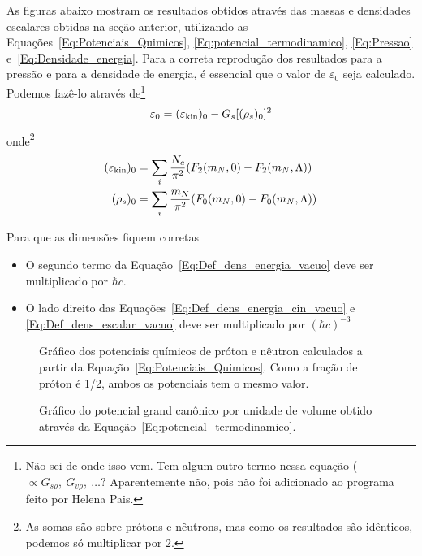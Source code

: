 As figuras abaixo mostram os resultados obtidos através das massas e densidades escalares obtidas na seção anterior, utilizando as Equações~\eqref{Eq:Potenciais_Quimicos}, \eqref{Eq:potencial_termodinamico}, \eqref{Eq:Pressao} e~\eqref{Eq:Densidade_energia}. Para a correta reprodução dos resultados para a pressão e para a densidade de energia, é essencial que o valor de $\varepsilon_0$ seja calculado. Podemos fazê-lo através de\footnote{Não sei de onde isso vem. Tem algum outro termo nessa equação ($\propto G_{s\rho},~G_{v\rho},~\dots$? Aparentemente não, pois não foi adicionado ao programa feito por Helena Pais.}
\begin{equation}\label{Eq:Def_dens_energia_vacuo}
	\varepsilon_0 = (\varepsilon_{\rm{kin}})_0 - G_s [(\rho_s)_0]^2
\end{equation}
%
onde\footnote{As somas são sobre prótons e nêutrons, mas como os resultados são idênticos, podemos só multiplicar por 2.}
\begin{align}
	(\varepsilon_{\rm{kin}})_0 &= \sum_i \frac{N_c}{\pi^2} (F_2(m_N,0) - F_2(m_N, \Lambda)) \label{Eq:Def_dens_energia_cin_vacuo}\\
	(\rho_s)_0 &= \sum_i \frac{m_N}{\pi^2} (F_0(m_N, 0) - F_0(m_N, \Lambda)) \label{Eq:Def_dens_escalar_vacuo}
\end{align}

Para que as dimensões fiquem corretas
\begin{itemize}
	\item O segundo termo da Equação~\eqref{Eq:Def_dens_energia_vacuo} deve ser multiplicado por $\hbar c$.
	\item O lado direito das Equações~\eqref{Eq:Def_dens_energia_cin_vacuo} e \eqref{Eq:Def_dens_escalar_vacuo} deve ser multiplicado por $(\hbar c)^{-3}$
\end{itemize}

\begin{figure}
	
	\caption{Gráfico dos potenciais químicos de próton e nêutron calculados a partir da Equação~\eqref{Eq:Potenciais_Quimicos}. Como a fração de próton é 1/2, ambos os potenciais tem o mesmo valor. \protect}
	\label{Fig:chemical_potential_graph}
\end{figure}

\begin{figure}
	
	\caption{Gráfico do potencial grand canônico por unidade de volume obtido através da Equação~\eqref{Eq:potencial_termodinamico}. \protect}
	\label{Fig:thermodynamic_potential_graph}
\end{figure}

